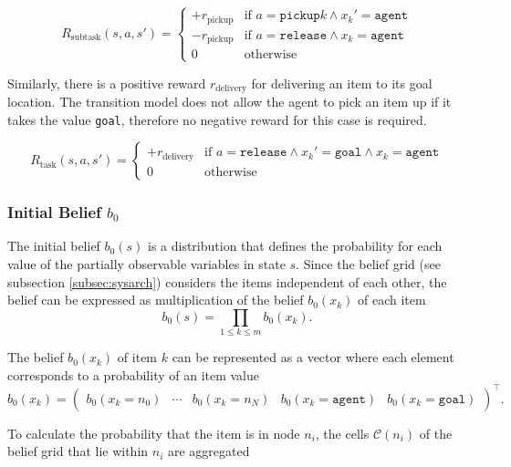\begin{equation}
    R_\text{subtask}(s,a,s') = \begin{cases}
    +r_\text{pickup} & \text{if }a=\texttt{pickup}k \land x_k'=\texttt{agent}\\
    -r_\text{pickup} & \text{if }a=\texttt{release}\land x_k=\texttt{agent}\\
    0 & \text{otherwise}\end{cases}
\end{equation}

Similarly, there is a positive reward $r_\text{delivery}$ for delivering an item to its goal location. The transition model does not allow the agent to pick an item up if it takes the value \texttt{goal}, therefore no negative reward for this case is required. 

\begin{equation}
    R_\text{task}(s,a,s') = \begin{cases} + r_\text{delivery} & \text{if }a=\texttt{release}\land x_k'=\texttt{goal}\land x_k=\texttt{agent}\\
    0 & \text{otherwise}
    \end{cases}
\end{equation}


\subsubsection{Initial Belief $b_0$}
The initial belief $b_0(s)$ is a distribution that defines the probability for each value of the partially observable variables in state $s$. Since the belief grid (see subsection \ref{subsec:sysarch}) considers the items independent of each other, the belief can be expressed as multiplication of the belief $b_0(x_k)$ of each item
\begin{equation}
    b_0(s) = \prod_{1\leq k \leq m} b_0(x_k).
\end{equation}

The belief $b_0(x_k)$ of item $k$ can be represented as a vector where each element corresponds to a probability of an item value 
\begin{equation}
    b_0(x_k) = \begin{pmatrix} b_0(x_k=n_0) & \cdots & b_0(x_k=n_N) & b_0(x_k=\texttt{agent}) & b_0(x_k=\texttt{goal}) \end{pmatrix}^\intercal.
\end{equation}

To calculate the probability that the item is in node $n_i$, the cells $\mathcal{C}(n_i)$ of the belief grid that lie within $n_i$ are aggregated

